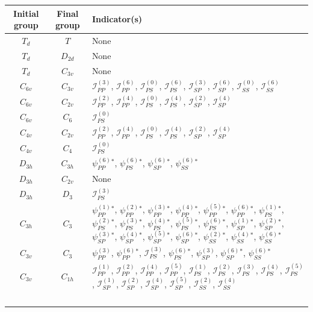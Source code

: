 \begin{table}
\centering
\footnotesize
\renewcommand{\arraystretch}{1.5}
\begin{tabularx}{\textwidth}{c|c|X}
\hline
\hline
\textbf{Initial group} & \textbf{Final group} & \textbf{Indicator(s)}\\
\hline
$T_{d}$ & $T$ & None \\
$T_{d}$ & $D_{2d}$ & None \\
$T_{d}$ & $C_{3v}$ & None \\
$C_{6v}$ & $C_{3v}$ & $\mathscr{I}_{PP}^{(3)}$, $\mathscr{I}_{PP}^{(6)}$, $\mathscr{I}_{PS}^{(0)}$, $\mathscr{I}_{PS}^{(6)}$, $\mathscr{I}_{SP}^{(3)}$, $\mathscr{I}_{SP}^{(6)}$, $\mathscr{I}_{SS}^{(0)}$, $\mathscr{I}_{SS}^{(6)}$ \\
$C_{6v}$ & $C_{2v}$ & $\mathscr{I}_{PP}^{(2)}$, $\mathscr{I}_{PP}^{(4)}$, $\mathscr{I}_{PS}^{(0)}$, $\mathscr{I}_{PS}^{(4)}$, $\mathscr{I}_{SP}^{(2)}$, $\mathscr{I}_{SP}^{(4)}$ \\
$C_{6v}$ & $C_{6}$ & $\mathscr{I}_{PS}^{(0)}$ \\
$C_{4v}$ & $C_{2v}$ & $\mathscr{I}_{PP}^{(2)}$, $\mathscr{I}_{PP}^{(4)}$, $\mathscr{I}_{PS}^{(0)}$, $\mathscr{I}_{PS}^{(4)}$, $\mathscr{I}_{SP}^{(2)}$, $\mathscr{I}_{SP}^{(4)}$ \\
$C_{4v}$ & $C_{4}$ & $\mathscr{I}_{PS}^{(0)}$ \\
$D_{3h}$ & $C_{3h}$ & $\psi_{PP}^{(6)}$$^*$, $\psi_{PS}^{(6)}$$^*$, $\psi_{SP}^{(6)}$$^*$, $\psi_{SS}^{(6)}$$^*$ \\
$D_{3h}$ & $C_{2v}$ & None \\
$D_{3h}$ & $D_{3}$ & $\mathscr{I}_{PS}^{(3)}$ \\
$C_{3h}$ & $C_{3}$ & $\psi_{PP}^{(1)}$$^*$, $\psi_{PP}^{(2)}$$^*$, $\psi_{PP}^{(3)}$$^*$, $\psi_{PP}^{(4)}$$^*$, $\psi_{PP}^{(5)}$$^*$, $\psi_{PP}^{(6)}$$^*$, $\psi_{PS}^{(1)}$$^*$, $\psi_{PS}^{(2)}$$^*$, $\psi_{PS}^{(3)}$$^*$, $\psi_{PS}^{(4)}$$^*$, $\psi_{PS}^{(5)}$$^*$, $\psi_{PS}^{(6)}$$^*$, $\psi_{SP}^{(1)}$$^*$, $\psi_{SP}^{(2)}$$^*$, $\psi_{SP}^{(3)}$$^*$, $\psi_{SP}^{(4)}$$^*$, $\psi_{SP}^{(5)}$$^*$, $\psi_{SP}^{(6)}$$^*$, $\psi_{SS}^{(2)}$$^*$, $\psi_{SS}^{(4)}$$^*$, $\psi_{SS}^{(6)}$$^*$ \\
$C_{3v}$ & $C_{3}$ & $\psi_{PP}^{(3)}$, $\psi_{PP}^{(6)}$$^*$, $\mathscr{I}_{PS}^{(3)}$, $\psi_{PS}^{(6)}$$^*$, $\psi_{SP}^{(3)}$, $\psi_{SP}^{(6)}$$^*$, $\psi_{SS}^{(6)}$$^*$ \\
$C_{3v}$ & $C_{1h}$ & $\mathscr{I}_{PP}^{(1)}$, $\mathscr{I}_{PP}^{(2)}$, $\mathscr{I}_{PP}^{(4)}$, $\mathscr{I}_{PP}^{(5)}$, $\mathscr{I}_{PS}^{(1)}$, $\mathscr{I}_{PS}^{(2)}$, $\mathscr{I}_{PS}^{(3)}$, $\mathscr{I}_{PS}^{(4)}$, $\mathscr{I}_{PS}^{(5)}$, $\mathscr{I}_{SP}^{(1)}$, $\mathscr{I}_{SP}^{(2)}$, $\mathscr{I}_{SP}^{(4)}$, $\mathscr{I}_{SP}^{(5)}$, $\mathscr{I}_{SS}^{(2)}$, $\mathscr{I}_{SS}^{(4)}$ \\
$$
\end{tabularx}
\end{table}
